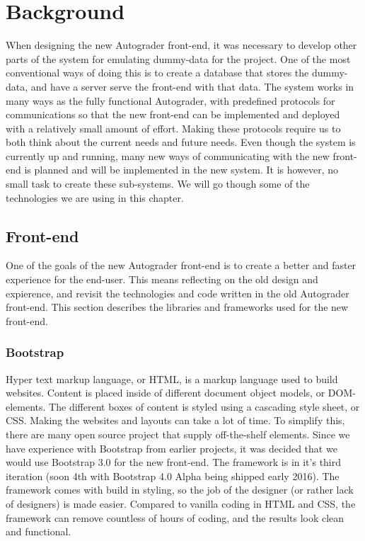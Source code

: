 \chapter{Background}
When designing the new Autograder front-end, it was necessary to develop other parts of the system for emulating dummy-data for the project. One of the most conventional ways of doing this is to create a database that stores the dummy-data, and have a server serve the front-end with that data. The system works in many ways as the fully functional Autograder, with predefined protocols for communications so that the new front-end can be implemented and deployed with a relatively small amount of effort. Making these protocols require us to both think about the current needs and future needs. Even though the system is currently up and running, many new ways of communicating with the new front-end is planned and will be implemented in the new system. It is however, no small task to create these sub-systems. We will go though some of the technologies we are using in this chapter.

\section{Front-end}
One of the goals of the new Autograder front-end is to create a better and faster experience for the end-user. This means reflecting on the old design and expierence, and revisit the technologies and code written in the old Autograder front-end. This section describes the libraries and frameworks used for the new front-end.

\subsection{Bootstrap}
Hyper text markup language, or HTML, is a markup language used to build websites. Content is placed inside of different document object models, or DOM-elements. The different boxes of content is styled using a cascading style sheet, or CSS. Making the websites and layouts can take a lot of time. To simplify this, there are many open source project that supply off-the-shelf elements. Since we have experience with Bootstrap from earlier projects, it was decided that we would use Bootstrap 3.0 for the new front-end. The framework is in it's third iteration (soon 4th with Bootstrap 4.0 Alpha being shipped early 2016). The framework comes with build in styling, so the job of the designer (or rather lack of designers) is made easier. Compared to vanilla coding in HTML and CSS, the framework can remove countless of hours of coding, and the results look clean and functional.

